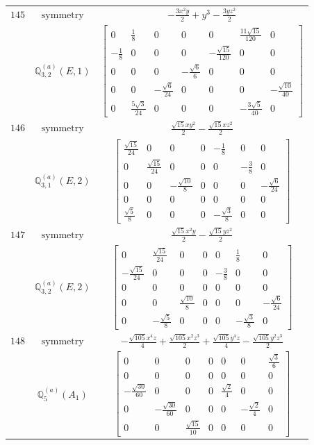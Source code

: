 \documentclass[fleqn,8pt,landscape]{jsarticle}
\begin{document}
\begin{longtable}{ccc}
$ 145 $ & $ \text{symmetry} $ & $ - \frac{3 x^{2} y}{2} + y^{3} - \frac{3 y z^{2}}{2} $ \\
$  $ & $ \mathbb{Q}_{3,2}^{(a)}(E,1) $ & $ \begin{bmatrix} 0 & \frac{1}{8} & 0 & 0 & 0 & \frac{11 \sqrt{15}}{120} & 0 \\ - \frac{1}{8} & 0 & 0 & 0 & - \frac{\sqrt{15}}{120} & 0 & 0 \\ 0 & 0 & 0 & - \frac{\sqrt{6}}{6} & 0 & 0 & 0 \\ 0 & 0 & - \frac{\sqrt{6}}{24} & 0 & 0 & 0 & - \frac{\sqrt{10}}{40} \\ 0 & \frac{5 \sqrt{3}}{24} & 0 & 0 & 0 & - \frac{3 \sqrt{5}}{40} & 0 \end{bmatrix} $ \\ \hline
$ 146 $ & $ \text{symmetry} $ & $ \frac{\sqrt{15} x y^{2}}{2} - \frac{\sqrt{15} x z^{2}}{2} $ \\
$  $ & $ \mathbb{Q}_{3,1}^{(a)}(E,2) $ & $ \begin{bmatrix} \frac{\sqrt{15}}{24} & 0 & 0 & 0 & - \frac{1}{8} & 0 & 0 \\ 0 & \frac{\sqrt{15}}{24} & 0 & 0 & 0 & - \frac{3}{8} & 0 \\ 0 & 0 & - \frac{\sqrt{10}}{8} & 0 & 0 & 0 & - \frac{\sqrt{6}}{24} \\ 0 & 0 & 0 & 0 & 0 & 0 & 0 \\ \frac{\sqrt{5}}{8} & 0 & 0 & 0 & - \frac{\sqrt{3}}{8} & 0 & 0 \end{bmatrix} $ \\ \hline
$ 147 $ & $ \text{symmetry} $ & $ \frac{\sqrt{15} x^{2} y}{2} - \frac{\sqrt{15} y z^{2}}{2} $ \\
$  $ & $ \mathbb{Q}_{3,2}^{(a)}(E,2) $ & $ \begin{bmatrix} 0 & \frac{\sqrt{15}}{24} & 0 & 0 & 0 & \frac{1}{8} & 0 \\ - \frac{\sqrt{15}}{24} & 0 & 0 & 0 & - \frac{3}{8} & 0 & 0 \\ 0 & 0 & 0 & 0 & 0 & 0 & 0 \\ 0 & 0 & \frac{\sqrt{10}}{8} & 0 & 0 & 0 & - \frac{\sqrt{6}}{24} \\ 0 & - \frac{\sqrt{5}}{8} & 0 & 0 & 0 & - \frac{\sqrt{3}}{8} & 0 \end{bmatrix} $ \\ \hline
$ 148 $ & $ \text{symmetry} $ & $ - \frac{\sqrt{105} x^{4} z}{4} + \frac{\sqrt{105} x^{2} z^{3}}{2} + \frac{\sqrt{105} y^{4} z}{4} - \frac{\sqrt{105} y^{2} z^{3}}{2} $ \\
$  $ & $ \mathbb{Q}_{5}^{(a)}(A_{1}) $ & $ \begin{bmatrix} 0 & 0 & 0 & 0 & 0 & 0 & \frac{\sqrt{3}}{6} \\ 0 & 0 & 0 & 0 & 0 & 0 & 0 \\ - \frac{\sqrt{30}}{60} & 0 & 0 & 0 & \frac{\sqrt{2}}{4} & 0 & 0 \\ 0 & - \frac{\sqrt{30}}{60} & 0 & 0 & 0 & - \frac{\sqrt{2}}{4} & 0 \\ 0 & 0 & \frac{\sqrt{15}}{10} & 0 & 0 & 0 & 0 \end{bmatrix} $ \\ \hline

\end{longtable}
\end{document}
